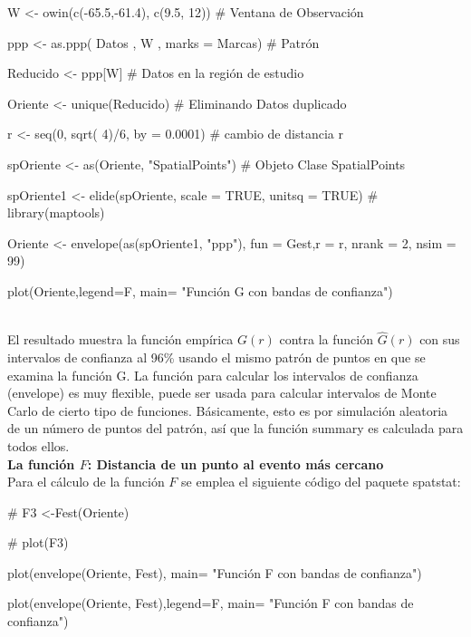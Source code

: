 \documentclass[12pt]{report}
\begin{document}
				{ \scriptsize  { \ttfamily  
					W <- owin(c(-65.5,-61.4), c(9.5, 12))        \#  Ventana de Observación
					
					ppp <- as.ppp( Datos , W , marks = Marcas)   \#  Patrón
					
					Reducido <- ppp[W]                         \# Datos en la región de estudio
					
				 	Oriente <-   unique(Reducido)               \#  Eliminando Datos duplicado
				 	
					r <- seq(0, sqrt( 4)/6, by = 0.0001)         \#  cambio de distancia r 
										
					spOriente <- as(Oriente, "SpatialPoints")   \#   Objeto Clase SpatialPoints
						
				    spOriente1 <- elide(spOriente, scale = TRUE, unitsq = TRUE)    \#    library(maptools)
				    				
					Oriente <- envelope(as(spOriente1, "ppp"), fun = Gest,r = r, nrank = 2, nsim = 99)  \vspace{-0,15 cm}
										
					plot(Oriente,legend=F, main= "Función G con bandas de confianza")  }}  \\
			
					
			El resultado muestra la función empírica $G(r)$  contra la función $ \hat{G}(r)$ con sus intervalos de confianza al 96\%  usando el mismo patrón de puntos en que se examina la función G.				
			La función para calcular los intervalos de confianza (envelope) es  muy flexible,  puede ser usada para calcular intervalos de Monte Carlo de cierto tipo de funciones. Básicamente, esto es por simulación aleatoria de un número de puntos del patrón, así que la función summary es calculada para todos ellos. \\
			 
				  
\textbf{La función $F$: Distancia de un punto al evento más cercano}{\label{F-codigo} }\\
				  
		 	Para el cálculo de la función $F$ se emplea el siguiente código del paquete spatstat:  \\	
					
					
				
					 	{ \scriptsize  { \ttfamily 	 
			    \#    F3 <-Fest(Oriente)
			    
				\#    plot(F3)	
															
				plot(envelope(Oriente, Fest), main= "Función F con bandas de confianza") \vspace{-0,15 cm}
											
				plot(envelope(Oriente, Fest),legend=F, main= "Función F con bandas de confianza")  }}  \\
			
\end{document}
